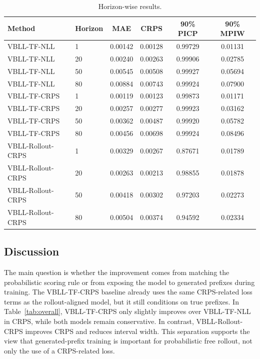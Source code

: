 \documentclass[conference]{IEEEtran}
\begin{document}
\begin{table}[t]
\centering
\scriptsize
\caption{Horizon-wise results.}
\label{tab:horizon}
\setlength{\tabcolsep}{2pt}
\begin{tabular}{@{}llcccc@{}}
\toprule
Method & Horizon & MAE & CRPS & 90\% PICP & 90\% MPIW \\
\midrule
VBLL-TF-NLL & 1 & 0.00142 & 0.00128 & 0.99729 & 0.01131 \\
VBLL-TF-NLL & 20 & 0.00240 & 0.00263 & 0.99906 & 0.02785 \\
VBLL-TF-NLL & 50 & 0.00545 & 0.00508 & 0.99927 & 0.05694 \\
VBLL-TF-NLL & 80 & 0.00884 & 0.00743 & 0.99924 & 0.07900 \\
\midrule
VBLL-TF-CRPS & 1 & 0.00119 & 0.00123 & 0.99873 & 0.01171 \\
VBLL-TF-CRPS & 20 & 0.00257 & 0.00277 & 0.99923 & 0.03162 \\
VBLL-TF-CRPS & 50 & 0.00362 & 0.00487 & 0.99920 & 0.05782 \\
VBLL-TF-CRPS & 80 & 0.00456 & 0.00698 & 0.99924 & 0.08496 \\
\midrule
VBLL-Rollout-CRPS & 1 & 0.00329 & 0.00267 & 0.87671 & 0.01789 \\
VBLL-Rollout-CRPS & 20 & 0.00263 & 0.00213 & 0.98855 & 0.01878 \\
VBLL-Rollout-CRPS & 50 & 0.00418 & 0.00302 & 0.97203 & 0.02273 \\
VBLL-Rollout-CRPS & 80 & 0.00504 & 0.00374 & 0.94592 & 0.02334 \\
\bottomrule
\end{tabular}
\end{table}

\subsection{Discussion}

The main question is whether the improvement comes from matching the
probabilistic scoring rule or from exposing the model to generated prefixes
during training. The VBLL-TF-CRPS baseline already uses the same CRPS-related
loss terms as the rollout-aligned model, but it still conditions on true
prefixes. In Table~\ref{tab:overall}, VBLL-TF-CRPS only slightly improves over
VBLL-TF-NLL in CRPS, while both models remain conservative. In contrast,
VBLL-Rollout-CRPS improves CRPS and reduces interval width. This separation
supports the view that generated-prefix training is important for
probabilistic free rollout, not only the use of a CRPS-related loss.
\end{document}
